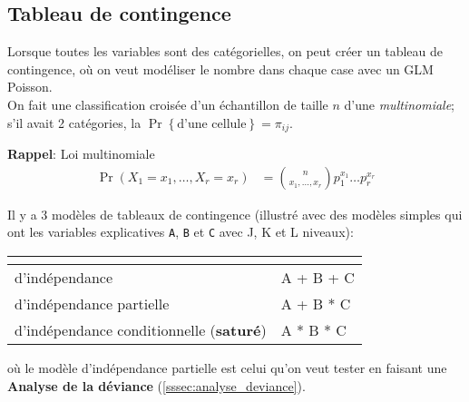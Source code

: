 \documentclass[10pt, french]{article}
\begin{document}
\begin{multicols*}{3}
\subsection*{Tableau de contingence}
Lorsque toutes les variables sont des catégorielles, on peut créer un tableau de contingence, où on veut modéliser le nombre dans chaque case avec un GLM Poisson. \\

On fait une classification croisée d'un échantillon de taille $n$ d'une \textit{multinomiale}; s'il avait 2 catégories, la $\Pr\left\{\text{d'une cellule}\right\} = \pi_{ij}$.
\setlength{\mathindent}{-1.5cm}
\begin{rappel}{\textbf{Rappel}: Loi multinomiale}
\begin{align*}
	\Pr(X_{1} = x_{1}, \dots, X_{r} = x_{r})
		&=	\binom{n}{x_{1}, \dots, x_{r}} p_{1}^{x_{1}} \dots p_{r}^{x_{r}}
\end{align*}
\end{rappel}
\setlength{\mathindent}{1cm}

Il y a 3 modèles de tableaux de contingence (illustré avec des modèles simples qui ont les variables explicatives \verb=A=, \verb=B= et \verb=C= avec J, K et L niveaux): 

\begin{tabular}{|l|l|}
\hline
\rowcolor[HTML]{21650A} 
\multicolumn{1}{|c|}{\cellcolor[HTML]{21650A}{\color[HTML]{FFFFFF} \textbf{Modèle}}} & \multicolumn{1}{c|}{\cellcolor[HTML]{21650A}{\color[HTML]{FFFFFF} \textbf{Équation}}} \\ \hline
\rowcolor[HTML]{B8F0A5} 
d'indépendance                                                                       & A + B + C                                                                             \\ \hline
\rowcolor[HTML]{B8F0A5} 
d'indépendance partielle                                                             & A + B * C                                                                             \\ \hline
\rowcolor[HTML]{B8F0A5} 
d'indépendance conditionnelle (\textbf{saturé})                                      & A * B * C                                                                             \\ \hline
\end{tabular}
où le modèle d'indépendance partielle est celui qu'on veut tester en faisant une \textbf{Analyse de la déviance} (\autoref{sssec:analyse_deviance}).



\end{multicols*}
\end{document}
